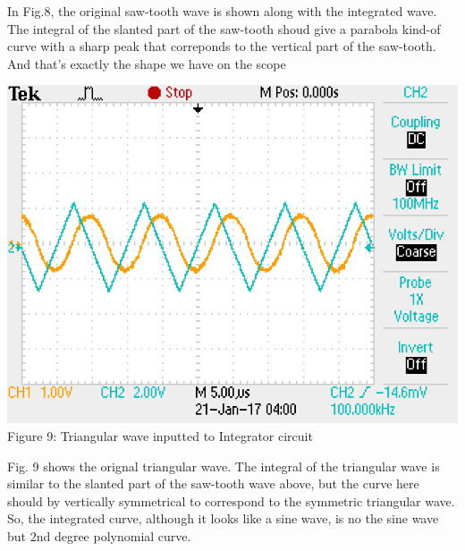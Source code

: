 \documentclass[]{article}
\begin{document}
In Fig.8, the original saw-tooth wave is shown along with the integrated wave. The integral of the slanted part of the saw-tooth shoud give a parabola kind-of curve with a sharp peak that correponds to the vertical part of the saw-tooth. And that's exactly the shape we have on the scope
\begin{center}
	\includegraphics[scale=0.7]{d_triangular}\\
	Figure 9: Triangular wave inputted to Integrator circuit
\end{center}
Fig. 9  shows the orignal triangular wave. The integral of the triangular wave is similar to  the slanted part of the saw-tooth wave above, but the curve here should by vertically symmetrical to correspond to the symmetric triangular wave. So, the integrated curve, although it looks like a sine wave, is no the sine wave but 2nd degree polynomial curve.\\
\end{document}
